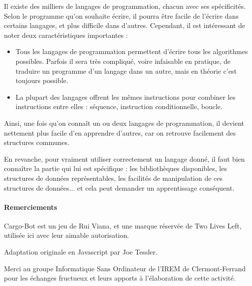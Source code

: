 \documentclass[a4paper,12pt,fleqn]{article}
\begin{document}
Il existe des milliers de langages de programmation, chacun avec ses
spécificités. Selon le programme qu'on souhaite écrire, il pourra être
facile de l'écrire dans certains langages, et plus difficile dans
d'autres. Cependant, il est intéressant de noter deux caractéristiques
importantes :
\begin{itemize}
\item Tous les langages de programmation permettent d'écrire tous les
  algorithmes possibles. Parfois il sera très compliqué, voire
  infaisable en pratique, de traduire un programme d'un langage dans
  un autre, mais en théorie c'est toujours possible.
\item La plupart des langages offrent les mêmes instructions 
  pour combiner les instructions entre elles : séquence, instruction
  conditionnelle, boucle.
\end{itemize}

Ainsi, une fois qu'on connaît un ou deux langages de programmation, il
devient nettement plus facile d'en apprendre d'autres, car on retrouve
facilement des structures communes.

En revanche, pour vraiment utiliser correctement un langage donné, il
faut bien connaître la partie qui lui est spécifique : les
bibliothèques disponibles, les structures de données représentables, les
facilités de manipulation de ces structures de données... et cela peut
demander un apprentissage conséquent.

\paragraph*{Remerciements}

Cargo-Bot est un jeu de Rui Viana, et une marque réservée de Two
    Lives Left, utilisée ici avec leur aimable autorisation.

Adaptation originale en Javascript par Joe Tessler.

Merci au groupe Informatique Sans Ordinateur de l'IREM de
Clermont-Ferrand pour les échanges fructueux et leurs apports à
l'élaboration de cette activité.

%
% 
\label{fin-document}
\end{document}
